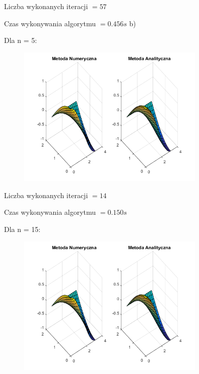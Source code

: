 Liczba wykonanych iteracji $ = 57 $

Czas wykonywania algorytmu $ = 0.456 s$
\newpage
b)

Dla n = 5:

\begin{figure}[!ht]
	\begin{center}
		\includegraphics[width=0.8\textwidth]{Lab6/charts/pr/zad2/5.png}
	\end{center}
\end{figure}

Liczba wykonanych iteracji $ = 14 $

Czas wykonywania algorytmu $ = 0.150 s$

Dla n = 15:

\begin{figure}[!ht]
	\begin{center}
		\includegraphics[width=0.8\textwidth]{Lab6/charts/pr/zad2/15.png}
	\end{center}
\end{figure}

